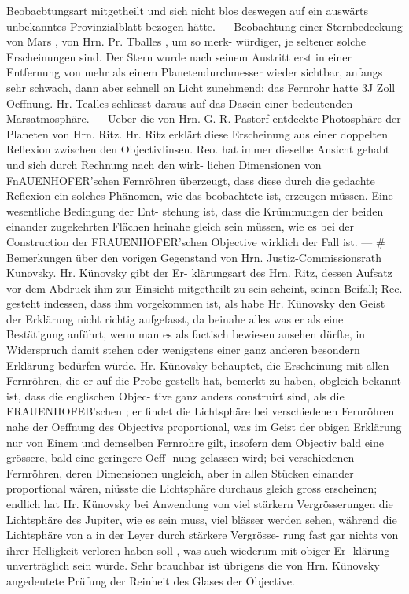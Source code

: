 \documentclass[12pt,a4paper]{article}
\begin{document}
{{{{{{{{Beobacbtungsart  mitgetheilt  und  sich  nicht  blos  deswegen  auf  ein  auswärts  unbekanntes  Provinzialblatt bezogen  hätte.  ---     Beobachtung  einer  Sternbedeckung  von  Mars  ,   von  Hrn.  Pr.  Tballes  ,    um  so  merk- würdiger, je  seltener  solche  Erscheinungen  sind.      Der  Stern   wurde   nach    seinem  Austritt  erst  in  einer Entfernung  von  mehr  als  einem  Planetendurchmesser  wieder  sichtbar,  anfangs  sehr  schwach,  dann  aber schnell  an  Licht  zunehmend;  das  Fernrohr  hatte  3J  Zoll  Oeffnung.     Hr.  Tealles  schliesst  daraus  auf  das Dasein   einer   bedeutenden  Marsatmosphäre.  ---    Ueber  die  von  Hrn.  G.  R.  Pastorf  entdeckte  Photosphäre der  Planeten    von  Hrn.  Ritz.     Hr.  Ritz  erklärt  diese  Erscheinung  aus  einer  doppelten  Reflexion  zwischen den  Objectivlinsen.    Reo.  hat  immer  dieselbe  Ansicht  gehabt  und  sich  durch  Rechnung  nach  den  wirk- lichen Dimensionen  von  FnAUENHOFER'schen  Fernröhren  überzeugt,  dass  diese  durch  die  gedachte  Reflexion ein  solches  Phänomen,  wie  das  beobachtete  ist,  erzeugen  müssen.     Eine  wesentliche  Bedingung  der  Ent- stehung ist,  dass  die  Krümmungen  der  beiden  einander  zugekehrten  Flächen  heinahe  gleich  sein  müssen, wie  es  bei  der  Construction    der  FRAUENHOFER'schen   Objective  wirklich  der  Fall  ist.  ---   \#  Bemerkungen über  den  vorigen  Gegenstand  von  Hrn.  Justiz-Commissionsrath   Kunovsky.      Hr.  Künovsky   gibt  der   Er- klärungsart des  Hrn.  Ritz,  dessen  Aufsatz  vor  dem  Abdruck  ihm  zur  Einsicht  mitgetheilt  zu  sein  scheint, seinen  Beifall;  Rec.  gesteht  indessen,  dass  ihm  vorgekommen  ist,  als  habe  Hr.  Künovsky  den  Geist  der Erklärung  nicht  richtig  aufgefasst,  da  beinahe  alles  was  er  als  eine  Bestätigung  anführt,  wenn  man  es als  factisch  bewiesen  ansehen  dürfte,   in  Widerspruch  damit  stehen  oder  wenigstens  einer  ganz  anderen besondern  Erklärung  bedürfen  würde.      Hr.  Künovsky  behauptet,   die  Erscheinung  mit  allen  Fernröhren, die  er  auf  die  Probe  gestellt  hat,  bemerkt  zu  haben,   obgleich  bekannt  ist,    dass  die  englischen  Objec- tive ganz  anders  construirt  sind,  als  die  FRAUENHOFEB'schen ;  er  findet  die  Lichtsphäre  bei  verschiedenen Fernröhren  nahe  der  Oeffnung  des  Objectivs  proportional,    was  im  Geist  der  obigen  Erklärung  nur  von Einem  und  demselben  Fernrohre  gilt,  insofern  dem  Objectiv  bald  eine  grössere,  bald  eine  geringere  Oeff- nung gelassen  wird;  bei  verschiedenen  Fernröhren,  deren  Dimensionen  ungleich,    aber  in  allen  Stücken einander  proportional  wären,  niüsste  die  Lichtsphäre  durchaus  gleich  gross  erscheinen;   endlich  hat  Hr. Künovsky  bei  Anwendung  von  viel  stärkern  Vergrösserungen  die  Lichtsphäre   des   Jupiter,    wie    es  sein muss,  viel  blässer  werden  sehen,  während  die  Lichtsphäre  von  a  in  der  Leyer  durch  stärkere  Vergrösse- rung  fast   gar    nichts   von  ihrer   Helligkeit   verloren    haben  soll ,    was   auch  wiederum    mit   obiger   Er- klärung unverträglich  sein  würde.      Sehr    brauchbar   ist  übrigens    die    von  Hrn.  Künovsky  angedeutete Prüfung  der  Reinheit  des  Glases  der  Objective.  }}}}}}}}
\end{document}
